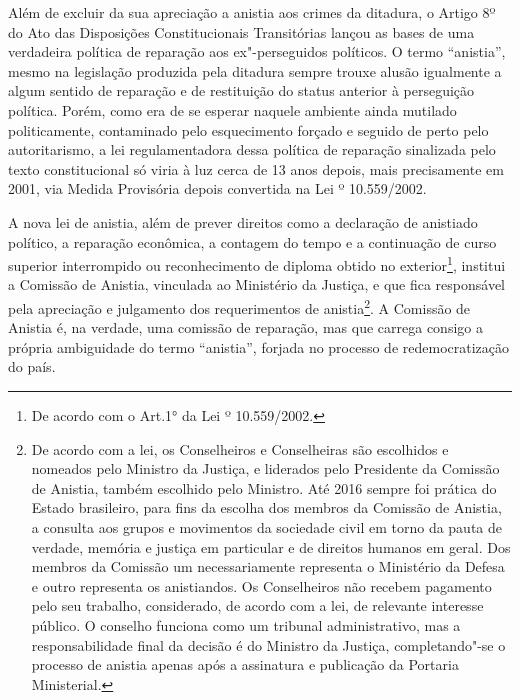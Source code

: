 Além de excluir da sua apreciação a anistia aos crimes da ditadura, o
Artigo 8º do Ato das Disposições Constitucionais Transitórias lançou as
bases de uma verdadeira política de reparação aos ex"-perseguidos
políticos. O termo ``anistia'', mesmo na legislação produzida pela
ditadura sempre trouxe alusão igualmente a algum sentido de reparação e
de restituição do status anterior à perseguição política. Porém, como
era de se esperar naquele ambiente ainda mutilado politicamente,
contaminado pelo esquecimento forçado e seguido de perto pelo
autoritarismo, a lei regulamentadora dessa política de reparação
sinalizada pelo texto constitucional só viria à luz cerca de 13 anos
depois, mais precisamente em 2001, via Medida Provisória depois
convertida na Lei º 10.559/2002.

A nova lei de anistia, além de prever direitos como a declaração de
anistiado político, a reparação econômica, a contagem do tempo e a
continuação de curso superior interrompido ou reconhecimento de diploma
obtido no exterior\footnote{De acordo com o Art.1° da Lei º
  10.559/2002.}, institui a Comissão de Anistia, vinculada ao Ministério
da Justiça, e que fica responsável pela apreciação e julgamento dos
requerimentos de anistia\footnote{De acordo com a lei, os Conselheiros e
  Conselheiras são escolhidos e nomeados pelo Ministro da Justiça, e
  liderados pelo Presidente da Comissão de Anistia, também escolhido
  pelo Ministro. Até 2016 sempre foi prática do Estado brasileiro, para
  fins da escolha dos membros da Comissão de Anistia, a consulta aos
  grupos e movimentos da sociedade civil em torno da pauta de verdade,
  memória e justiça em particular e de direitos humanos em geral. Dos
  membros da Comissão um necessariamente representa o Ministério da
  Defesa e outro representa os anistiandos. Os Conselheiros não recebem
  pagamento pelo seu trabalho, considerado, de acordo com a lei, de
  relevante interesse público. O conselho funciona como um tribunal
  administrativo, mas a responsabilidade final da decisão é do Ministro
  da Justiça, completando"-se o processo de anistia apenas após a
  assinatura e publicação da Portaria Ministerial.}. A Comissão de
Anistia é, na verdade, uma comissão de reparação, mas que carrega
consigo a própria ambiguidade do termo ``anistia'', forjada no processo de
redemocratização do país.


